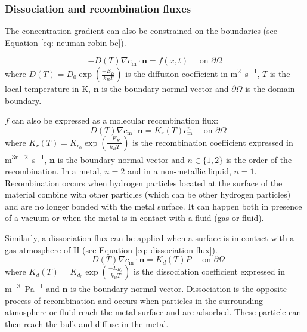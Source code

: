 \subsubsection{Dissociation and recombination fluxes}

The concentration gradient can also be constrained on the boundaries (see Equation \ref{eq: neuman robin bc}).

\begin{equation}
    - D(T)\nabla c_\mathrm{m} \cdot \mathbf{n} = f(x, t) \quad \text { on } \partial \Omega
    \label{eq: neuman robin bc}
\end{equation}
where $D(T) = D_0 \exp(\frac{-E_D}{k_B T}) $ is the diffusion coefficient in \si{m^2.s^{-1}}, $T$ is the local temperature in \si{K}, $\mathbf{n}$ is the boundary normal vector and $\partial \Omega$ is the domain boundary.

$f$ can also be expressed as a molecular recombination flux:
\begin{equation}
    - D(T)\nabla c_\mathrm{m} \cdot \mathbf{n} = K_r(T) c_\mathrm{m}^n \quad \text { on } \partial \Omega
    \label{eq: recombination flux}
\end{equation}
where $K_r(T) = K_{r_0} \exp(\frac{-E_{K_r}}{k_B T}) $ is the recombination coefficient expressed in \si{m^{3n-2}.s^{-1}}, $\mathbf{n}$ is the boundary normal vector and $n \in \{1, 2\}$ is the order of the recombination.
In a metal, $n=2$ and in a non-metallic liquid, $n=1$.
Recombination occurs when hydrogen particles located at the surface of the material combine with other particles (which can be other hydrogen particles) and are no longer bonded with the metal surface.
It can happen both in presence of a vacuum or when the metal is in contact with a fluid (gas or fluid).

Similarly, a dissociation flux can be applied when a surface is in contact with a gas atmosphere of H (see Equation \ref{eq: dissociation flux}).
\begin{equation}
    - D(T)\nabla c_\mathrm{m} \cdot \mathbf{n} = K_d(T) P \quad \text { on } \partial \Omega
    \label{eq: dissociation flux}
\end{equation}
where $K_d(T) = K_{d_0} \exp(\frac{-E_{K_d}}{k_B T}) $ is the dissociation coefficient expressed in \si{m^{-3}.Pa^{-1}} and $\mathbf{n}$ is the boundary normal vector.
Dissociation is the opposite process of recombination and occurs when particles in the surrounding atmosphere or fluid reach the metal surface and are adsorbed.
These particle can then reach the bulk and diffuse in the metal.

